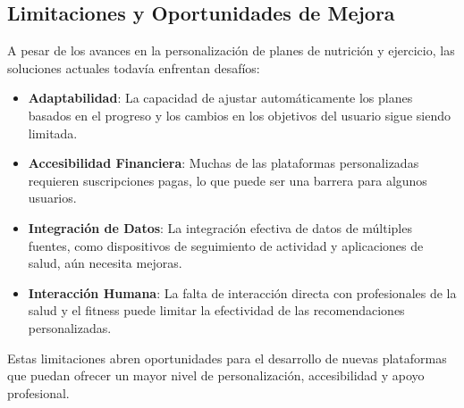\subsection{Limitaciones y Oportunidades de Mejora}

A pesar de los avances en la personalización de planes de nutrición y ejercicio, las soluciones actuales todavía enfrentan desafíos:

\begin{itemize}
  \item \textbf{Adaptabilidad}: La capacidad de ajustar automáticamente los planes basados en el progreso y los cambios en los objetivos del usuario sigue siendo limitada.
  \item \textbf{Accesibilidad Financiera}: Muchas de las plataformas personalizadas requieren suscripciones pagas, lo que puede ser una barrera para algunos usuarios.
  \item \textbf{Integración de Datos}: La integración efectiva de datos de múltiples fuentes, como dispositivos de seguimiento de actividad y aplicaciones de salud, aún necesita mejoras.
  \item \textbf{Interacción Humana}: La falta de interacción directa con profesionales de la salud y el fitness puede limitar la efectividad de las recomendaciones personalizadas.
\end{itemize}

Estas limitaciones abren oportunidades para el desarrollo de nuevas plataformas que puedan ofrecer un mayor nivel de personalización, accesibilidad y apoyo profesional.